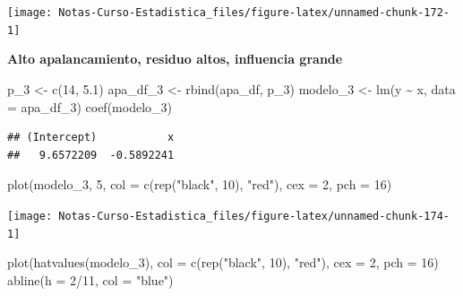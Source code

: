 \documentclass[
  12pt,
]{book}
\newenvironment{Shaded}{\begin{snugshade}}{\end{snugshade}}
\newcommand{\AttributeTok}[1]{\textcolor[rgb]{0.77,0.63,0.00}{#1}}
\newcommand{\DecValTok}[1]{\textcolor[rgb]{0.00,0.00,0.81}{#1}}
\newcommand{\FloatTok}[1]{\textcolor[rgb]{0.00,0.00,0.81}{#1}}
\newcommand{\FunctionTok}[1]{\textcolor[rgb]{0.00,0.00,0.00}{#1}}
\newcommand{\NormalTok}[1]{#1}
\newcommand{\OtherTok}[1]{\textcolor[rgb]{0.56,0.35,0.01}{#1}}
\newcommand{\SpecialCharTok}[1]{\textcolor[rgb]{0.00,0.00,0.00}{#1}}
\newcommand{\StringTok}[1]{\textcolor[rgb]{0.31,0.60,0.02}{#1}}
\theoremstyle{definition}
\theoremstyle{definition}
\theoremstyle{definition}
\theoremstyle{definition}
\theoremstyle{remark}
\begin{document}
\begin{center}\texttt{[image: Notas-Curso-Estadistica\_files/figure-latex/unnamed-chunk-172-1]} \end{center}

\textbf{Alto apalancamiento, residuo altos, influencia grande}

\begin{Shaded}
\begin{Highlighting}[]
\NormalTok{p\_3 }\OtherTok{\textless{}{-}} \FunctionTok{c}\NormalTok{(}\DecValTok{14}\NormalTok{, }\FloatTok{5.1}\NormalTok{)}
\NormalTok{apa\_df\_3 }\OtherTok{\textless{}{-}} \FunctionTok{rbind}\NormalTok{(apa\_df, p\_3)}
\NormalTok{modelo\_3 }\OtherTok{\textless{}{-}} \FunctionTok{lm}\NormalTok{(y }\SpecialCharTok{\textasciitilde{}}\NormalTok{ x, }\AttributeTok{data =}\NormalTok{ apa\_df\_3)}
\FunctionTok{coef}\NormalTok{(modelo\_3)}
\end{Highlighting}
\end{Shaded}

\begin{verbatim}
## (Intercept)           x 
##   9.6572209  -0.5892241
\end{verbatim}

\begin{Shaded}
\begin{Highlighting}[]
\FunctionTok{plot}\NormalTok{(modelo\_3, }\DecValTok{5}\NormalTok{, }\AttributeTok{col =} \FunctionTok{c}\NormalTok{(}\FunctionTok{rep}\NormalTok{(}\StringTok{"black"}\NormalTok{, }\DecValTok{10}\NormalTok{), }\StringTok{"red"}\NormalTok{),}
    \AttributeTok{cex =} \DecValTok{2}\NormalTok{, }\AttributeTok{pch =} \DecValTok{16}\NormalTok{)}
\end{Highlighting}
\end{Shaded}

\begin{center}\texttt{[image: Notas-Curso-Estadistica\_files/figure-latex/unnamed-chunk-174-1]} \end{center}

\begin{Shaded}
\begin{Highlighting}[]
\FunctionTok{plot}\NormalTok{(}\FunctionTok{hatvalues}\NormalTok{(modelo\_3), }\AttributeTok{col =} \FunctionTok{c}\NormalTok{(}\FunctionTok{rep}\NormalTok{(}\StringTok{"black"}\NormalTok{, }\DecValTok{10}\NormalTok{),}
    \StringTok{"red"}\NormalTok{), }\AttributeTok{cex =} \DecValTok{2}\NormalTok{, }\AttributeTok{pch =} \DecValTok{16}\NormalTok{)}
\FunctionTok{abline}\NormalTok{(}\AttributeTok{h =} \DecValTok{2}\SpecialCharTok{/}\DecValTok{11}\NormalTok{, }\AttributeTok{col =} \StringTok{"blue"}\NormalTok{)}
\end{Highlighting}
\end{Shaded}
\end{document}
